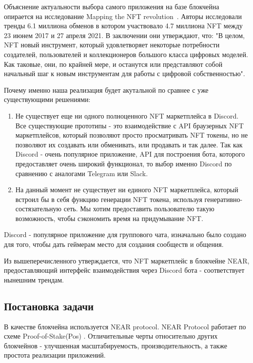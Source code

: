 Объяснение актуальности выбора самого приложения на базе блокчейна опирается на исследование Mapping the NFT revolution~\cite{2021}. Авторы исследовали тренды 6.1 миллиона обменов в котором участвовало 4.7 миллиона NFT между 23 июнем 2017 и 27 апреля 2021. В заключении они утверждают, что: "В целом, NFT новый инструмент, который удовлетворяет некоторые потребности создателей, пользователей и коллекционеров большого класса цифровых моделей. Как таковые, они, по крайней мере, и останутся или представляют собой начальный шаг к новым инструментам для работы с цифровой собственностью".

Почему именно наша реализация будет акутальной по сравнее с уже существующими решениями:


\begin{enumerate}
	\item Не существует еще ни одного полноценного NFT маркетплейса в Discord. Все существующие прототипы - это взаимодействие с API браузерных NFT маркетплейсов, который позволяют просто просматривать NFT токены, но не позволяют их создавать или обменивать, или продавать и так далее.
    Так как Discord - очень популярное приложение, API для построения бота, которого предоставляет очень широкий функционал, то выбор именно Discord по сравнению с аналогами Telegram или Slack.
	\item На данный момент не существует ни единого NFT маркетплейса, который встроил бы в себя функцию генерации NFT токена, используя генеративно-состязательную сеть. Мы хотим предоставить пользователю такую возможность, чтобы сэкономить время на придумывание NFT. 
\end{enumerate}

\begin{definition}
    Discord - популярное приложение для группового чата, изначально было создано для того, чтобы дать геймерам место для создания сообществ и общения.
\end{definition}

Из вышеперечисленного утверждается, что NFT маркетплейс в блокчейне NEAR, предоставляющий интерфейс взаимодействия через Discord бота - соответствует нынешним трендам.


\subsection{Постановка задачи}
В качестве блокчейна используется NEAR protocol\cite{nearprotocol_2022}. NEAR Protocol работает по схеме Proof-of-Stake(Pos) \cite{nearprotocolpos}. Отличительные черты относительно других блокчейнов - улучшенная масштабируемость, производительность, а также простота реализации приложений.

